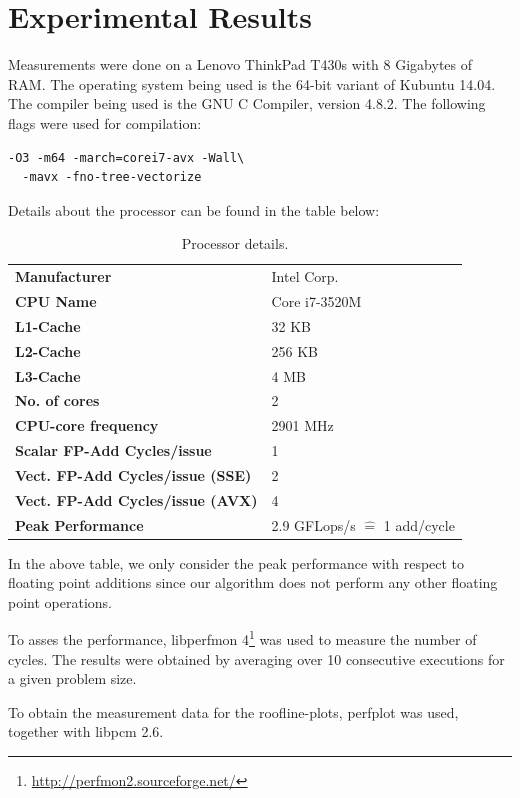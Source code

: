 \section{Experimental Results}

 Measurements were done on a Lenovo ThinkPad T430s
with 8 Gigabytes of RAM. The operating system being used is the 64-bit variant
of Kubuntu 14.04. The compiler being used is the GNU C Compiler, version 4.8.2.
The following flags were used for compilation:

\begin{verbatim}
-O3 -m64 -march=corei7-avx -Wall\
  -mavx -fno-tree-vectorize
\end{verbatim}

Details about the processor can be found in the table below:

\begin{table}[H]
\begin{center}
\begin{tabular}{>{\bfseries}ll}
Manufacturer         & Intel Corp.\\
CPU Name             & Core i7-3520M\\
L1-Cache             & 32 KB\\
L2-Cache             & 256 KB\\
L3-Cache             & 4 MB\\
No. of cores         & 2\\
CPU-core frequency   & 2901 MHz\\
Scalar FP-Add Cycles/issue  & 1\\
Vect. FP-Add Cycles/issue (SSE) & 2\\
Vect. FP-Add Cycles/issue (AVX) & 4\\
Peak Performance     & 2.9 GFLops/s $\hat{=}$ 1 add/cycle
\end{tabular}
\end{center}
\caption{Processor details.}
\label{tblProc}
\end{table}

In the above table, we only consider the peak performance with respect to
floating point additions since our algorithm does not perform any other floating
point operations.

To asses the performance, libperfmon
4\footnote{\url{http://perfmon2.sourceforge.net/}} was used to measure the
number of cycles. The results were obtained by averaging over 10 consecutive
executions for a given problem size.

To obtain the measurement data for the roofline-plots, perfplot was used,
together with libpcm 2.6.

